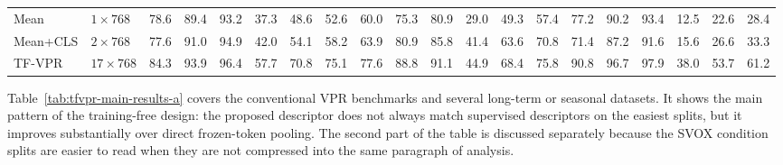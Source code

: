 \begin{table}[htb]
{\begin{tabular}{llcccccccccccccccccc}
    Mean & \(1 \times 768\) & 78.6 & 89.4 & 93.2 & 37.3 & 48.6 & 52.6 & 60.0 & 75.3 & 80.9 & 29.0 & 49.3 & 57.4 & 77.2 & 90.2 & 93.4 & 12.5 & 22.6 & 28.4 \\
    Mean+CLS & \(2 \times 768\) & 77.6 & 91.0 & 94.9 & 42.0 & 54.1 & 58.2 & 63.9 & 80.9 & 85.8 & 41.4 & 63.6 & 70.8 & 71.4 & 87.2 & 91.6 & 15.6 & 26.6 & 33.3 \\
    \rowcolor[HTML]{C7EAF3}
    TF-VPR & \(17 \times 768\) & 84.3 & 93.9 & 96.4 & 57.7 & 70.8 & 75.1 & 77.6 & 88.8 & 91.1 & 44.9 & 68.4 & 75.8 & 90.8 & 96.7 & 97.9 & 38.0 & 53.7 & 61.2 \\
    \bottomrule
  \end{tabular}}
\end{table}

Table~\ref{tab:tfvpr-main-results-a} covers the conventional VPR benchmarks and several long-term or seasonal datasets. It shows the main pattern of the training-free design: the proposed descriptor does not always match supervised descriptors on the easiest splits, but it improves substantially over direct frozen-token pooling. The second part of the table is discussed separately because the SVOX condition splits are easier to read when they are not compressed into the same paragraph of analysis.

